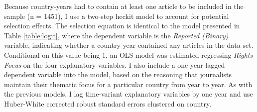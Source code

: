 \documentclass[11pt, oneside]{article}
\begin{document}
Because country-years had to contain at least one article to be included in the sample (n = 1451), I use a two-step heckit model to account for potential selection effects. The selection equation is identical to the model presented in Table \ref{table:logit}, where the dependent variable is the \emph{Reported (Binary)} variable, indicating whether a country-year contained any articles in the data set. Conditional on this value being 1, an OLS model was estimated regressing \emph{Rights Focus} on the four explanatory variables. I also include a one-year lagged dependent variable into the model, based on the reasoning that journalists maintain their thematic focus for a particular country from year to year. As with the previous models, I lag time-variant explanatory variables by one year and use Huber-White corrected robust standard errors clustered on country.
\end{document}
